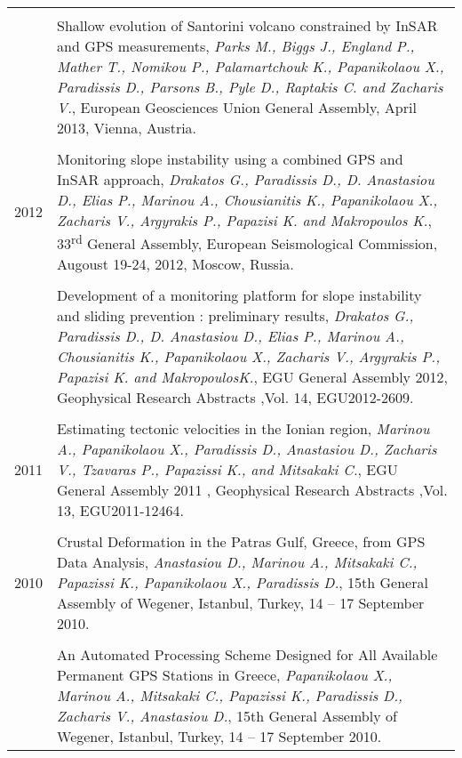 \documentclass[9pt]{extarticle} %
\begin{document}
\begin{longtable}{r|p{14cm}}
  &\\

  & Shallow evolution of Santorini volcano constrained by InSAR and GPS measurements,
  \emph{Parks M., Biggs J., England P., Mather T., Nomikou P., Palamartchouk K., Papanikolaou X., Paradissis D., Parsons B., Pyle D., Raptakis C. and Zacharis V.},
  European Geosciences Union General Assembly, April 2013, Vienna, Austria.\\

\multicolumn{2}{c}{} \\
  \textsc{2012}
  & Monitoring slope instability using a combined GPS and InSAR approach,
  \emph{Drakatos G., Paradissis D., D. Anastasiou D., Elias P., Marinou A., Chousianitis K., Papanikolaou X., Zacharis V., Argyrakis P., Papazisi K. and Makropoulos K.},
  33\textsuperscript{rd} General Assembly, European Seismological Commission, Augoust 19-24, 2012, Moscow, Russia.\\

  &\\

  & Development of a monitoring platform for slope instability and sliding prevention : preliminary results,
  \emph{Drakatos G., Paradissis D., D. Anastasiou D., Elias P., Marinou A., Chousianitis K., Papanikolaou X., Zacharis V., Argyrakis P., Papazisi K. and MakropoulosK.},
  EGU General Assembly 2012, Geophysical Research Abstracts ,Vol. 14, EGU2012-2609.\\

\multicolumn{2}{c}{} \\
  \textsc{2011}
  & Estimating tectonic velocities in the Ionian region, 
  \emph{Marinou Α., Papanikolaou X., Paradissis D., Anastasiou D., Zacharis V., Tzavaras P., Papazissi K., and Mitsakaki C.},
  EGU General Assembly 2011 , Geophysical Research Abstracts ,Vol. 13, EGU2011-12464.\\

\multicolumn{2}{c}{} \\
  \textsc{2010}
  & Crustal Deformation in the Patras Gulf, Greece, from GPS Data Analysis,
  \emph{Anastasiou D., Marinou A., Mitsakaki C., Papazissi K., Papanikolaou X., Paradissis D.},
  15th General Assembly of Wegener, Istanbul, Turkey, 14 – 17 September 2010.\\

  &\\

  & An Automated Processing Scheme Designed for All Available Permanent GPS Stations in Greece,
  \emph{Papanikolaou X., Marinou A., Mitsakaki C., Papazissi K., Paradissis D., Zacharis V., Anastasiou D.},
  15th General Assembly of Wegener, Istanbul, Turkey, 14 – 17 September 2010.\\


\end{longtable}
\end{document}
